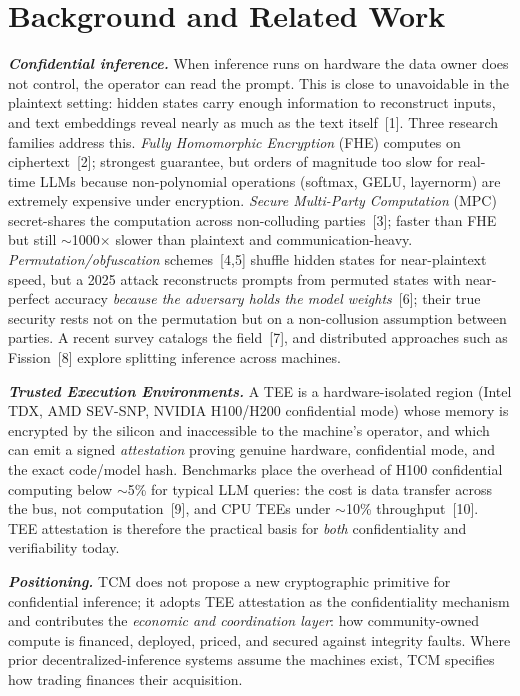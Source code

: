\documentclass[11pt]{article}
\newcommand{\ph}[1]{\textbf{\textit{#1}}}
\begin{document}
\section{Background and Related Work}
\ph{Confidential inference.} When inference runs on hardware the data owner does not control, the operator can read the prompt. This is close to unavoidable in the plaintext setting: hidden states carry enough information to reconstruct inputs, and text embeddings reveal nearly as much as the text itself~[1]. Three research families address this. \textit{Fully Homomorphic Encryption} (FHE) computes on ciphertext~[2]; strongest guarantee, but orders of magnitude too slow for real-time LLMs because non-polynomial operations (softmax, GELU, layernorm) are extremely expensive under encryption. \textit{Secure Multi-Party Computation} (MPC) secret-shares the computation across non-colluding parties~[3]; faster than FHE but still $\sim$1000$\times$ slower than plaintext and communication-heavy. \textit{Permutation/obfuscation} schemes~[4,5] shuffle hidden states for near-plaintext speed, but a 2025 attack reconstructs prompts from permuted states with near-perfect accuracy \textit{because the adversary holds the model weights}~[6]; their true security rests not on the permutation but on a non-collusion assumption between parties. A recent survey catalogs the field~[7], and distributed approaches such as Fission~[8] explore splitting inference across machines.

\ph{Trusted Execution Environments.} A TEE is a hardware-isolated region (Intel TDX, AMD SEV-SNP, NVIDIA H100/H200 confidential mode) whose memory is encrypted by the silicon and inaccessible to the machine's operator, and which can emit a signed \textit{attestation} proving genuine hardware, confidential mode, and the exact code/model hash. Benchmarks place the overhead of H100 confidential computing below $\sim$5\% for typical LLM queries: the cost is data transfer across the bus, not computation~[9], and CPU TEEs under $\sim$10\% throughput~[10]. TEE attestation is therefore the practical basis for \textit{both} confidentiality and verifiability today.

\ph{Positioning.} TCM does not propose a new cryptographic primitive for confidential inference; it adopts TEE attestation as the confidentiality mechanism and contributes the \textit{economic and coordination layer}: how community-owned compute is financed, deployed, priced, and secured against integrity faults. Where prior decentralized-inference systems assume the machines exist, TCM specifies how trading finances their acquisition.
\end{document}

